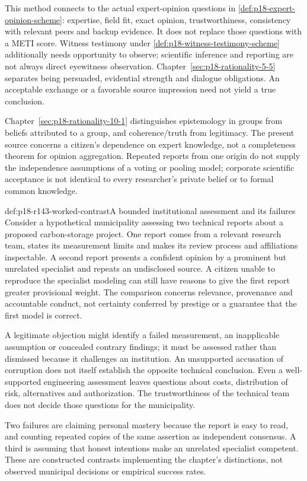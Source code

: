 This method connects to the actual expert-opinion questions in
\ref{def:p18-expert-opinion-scheme}: expertise, field fit, exact opinion,
trustworthiness, consistency with relevant peers and backup evidence.
It does not replace those questions with a METI score. Witness testimony
under \ref{def:p18-witness-testimony-scheme} additionally needs opportunity
to observe; scientific inference and reporting are not always direct
eyewitness observation. Chapter~\ref{sec:p18-rationality-5-5} separates
being persuaded, evidential strength and dialogue obligations. An acceptable
exchange or a favorable source impression need not yield a true conclusion.

Chapter~\ref{sec:p18-rationality-10-1} distinguishes epistemology in groups
from beliefs attributed to a group, and coherence/truth from legitimacy.
The present source concerns a citizen's dependence on expert knowledge,
not a completeness theorem for opinion aggregation. Repeated reports
from one origin do not supply the independence assumptions of a voting
or pooling model; corporate scientific acceptance is not identical to
every researcher's private belief or to formal common knowledge.

\begin{hbexample}{def:p18-r143-worked-contrast}{A bounded institutional assessment and its failures}
Consider a hypothetical municipality assessing two technical reports
about a proposed carbon-storage project. One report comes from a relevant
research team, states its measurement limits and makes its review process
and affiliations inspectable. A second report presents a confident
opinion by a prominent but unrelated specialist and repeats an undisclosed
source. A citizen unable to reproduce the specialist modeling can still
have reasons to give the first report greater provisional weight.
The comparison concerns relevance, provenance and accountable conduct,
not certainty conferred by prestige or a guarantee that the first model
is correct.

A legitimate objection might identify a failed measurement, an inapplicable
assumption or concealed contrary findings; it must be assessed rather than
dismissed because it challenges an institution. An unsupported accusation
of corruption does not itself establish the opposite technical conclusion.
Even a well-supported engineering assessment leaves questions about costs,
distribution of risk, alternatives and authorization. The trustworthiness
of the technical team does not decide those questions for the municipality.

Two failures are claiming personal mastery because the report is easy
to read, and counting repeated copies of the same assertion as independent
consensus. A third is assuming that honest intentions make an unrelated
specialist competent. These are constructed contrasts implementing the
chapter's distinctions, not observed municipal decisions or empirical
success rates.
\end{hbexample}

